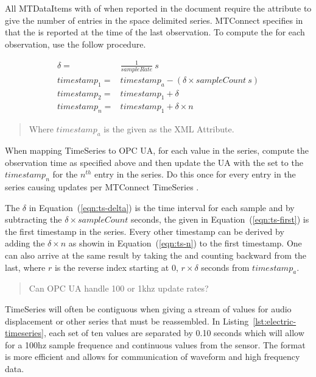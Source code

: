 All \glspl{MTDataItem} with  of  when reported in the  document require the attribute  to give the number of entries in the space delimited series. MTConnect specifies in \cite{MTCPart3} that the  is reported at the time of the last observation. To compute the  for each observation, use the follow procedure.

\begin{align}
  \delta =& \frac{1}{sampleRate}\ s \label{eqn:ts-delta} \\
  timestamp_1 =& timestamp_a - (\delta \times sampleCount\ s) \label{eqn:ts-first} \\
  timestamp_2 =& timestamp_1 + \delta  \label{eqn:ts-second} \\
  timestamp_n =& timestamp_1 + \delta \times n \label{eqn:ts-n}
\end{align}
\begin{quote}
  Where $timestamp_a$ is the  given as the XML Attribute.
\end{quote}

When mapping \gls{TimeSeries} to OPC UA, for each value in the series, compute the observation time as specified above and then update the UA  with the  set to the $timestamp_n$ for the $n^{th}$ entry in the series. Do this once for every entry in the series causing  updates per MTConnect \gls{TimeSeries} .

The $\delta$ in Equation~(\ref{eqn:ts-delta}) is the time interval for each sample and by subtracting the $\delta \times sampleCount$ seconds, the given in Equation~(\ref{eqn:ts-first}) is the first timestamp in the series. Every other timestamp can be derived by adding the $\delta \times n$ as showin in Equation~(\ref{eqn:ts-n}) to the first timestamp. One can also arrive at the same result by taking the  and counting backward from the last, where $r$ is the reverse index starting at 0, $r \times \delta$ seconds from $timestamp_a$.

\begin{quote}
  \color{red} Can OPC UA handle 100 or 1khz update rates?
\end{quote}

\gls{TimeSeries}  will often be contiguous when giving a stream of values for audio displacement or other series that must be reassembled. In Listing~\ref{lst:electric-timeseries}, each set of ten values are separated by 0.10 seconds which will allow for a 100hz sample frequence and continuous values from the sensor. The format is more efficient and allows for communication of waveform and high frequency data.

